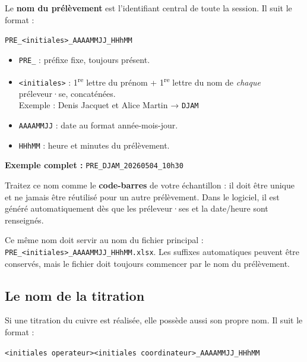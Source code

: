 \documentclass[12pt, a4paper]{article}
\begin{document}
Le \textbf{nom du prélèvement} est l'identifiant central de toute
la session. Il suit le format :

\begin{center}
  \large\texttt{PRE\_<initiales>\_AAAAMMJJ\_HHhMM}
\end{center}

\begin{itemize}
  \item \texttt{PRE\_} : préfixe fixe, toujours présent.
  \item \texttt{<initiales>} : 1\textsuperscript{re} lettre du prénom + 1\textsuperscript{re}
        lettre du nom de \emph{chaque} préleveur·se, concaténées.\\
        Exemple : Denis Jacquet et Alice Martin → \texttt{DJAM}
  \item \texttt{AAAAMMJJ} : date au format année-mois-jour.
  \item \texttt{HHhMM} : heure et minutes du prélèvement.
\end{itemize}

\begin{center}
  \large\textbf{Exemple complet :} \texttt{PRE\_DJAM\_20260504\_10h30}
\end{center}

\begin{conseil}
  Traitez ce nom comme le \textbf{code-barres} de votre échantillon :
  il doit être unique et ne jamais être réutilisé pour un autre prélèvement.
  Dans le logiciel, il est généré automatiquement dès que les
  préleveur·ses et la date/heure sont renseignés.
\end{conseil}

\begin{important}
  Ce même nom doit servir au nom du fichier principal :
  \texttt{PRE\_<initiales>\_AAAAMMJJ\_HHhMM.xlsx}. Les suffixes
  automatiques peuvent être conservés, mais le fichier doit toujours
  commencer par le nom du prélèvement.
\end{important}

\subsection{Le nom de la titration}

Si une titration du cuivre est réalisée, elle possède aussi son
propre nom. Il suit le format :

\begin{center}
  \large\texttt{<initiales operateur><initiales coordinateur>\_AAAAMMJJ\_HHhMM}
\end{center}
\end{document}
